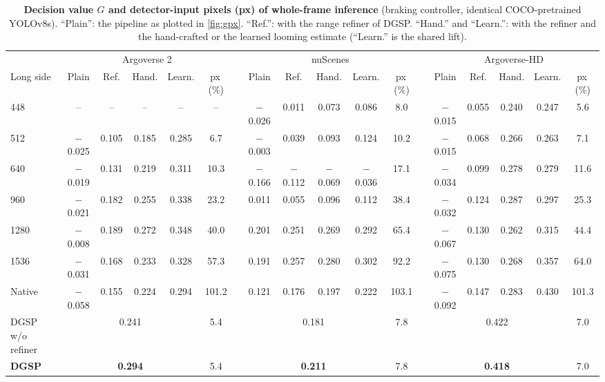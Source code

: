 \documentclass[10pt,letterpaper]{article}
\newcommand{\method}{DGSP\xspace}
\newcommand{\G}{G}
\newcommand{\oursrow}{\rowcolor{oursbg}}
\newcommand{\na}{--}
\theoremstyle{remark}
\theoremstyle{plain}
\theoremstyle{definition}
\begin{document}
\begin{landscape}
\begin{table}[!h]
\centering
\caption{\textbf{Decision value $\G$ and detector-input pixels (px) of whole-frame inference} (braking controller, identical COCO-pretrained YOLOv8s). ``Plain'': the pipeline as plotted in \cref{fig:gpx}. ``Ref.'': with the range refiner of \method. ``Hand.'' and ``Learn.'': with the refiner and the hand-crafted or the learned looming estimate (``Learn.'' is the shared lift).}
\label{tab:uniform}
\small
\setlength{\tabcolsep}{2.6pt}
\begin{tabular}{@{}lccccccccccccccccc@{}}
\toprule
 & \multicolumn{5}{c}{Argoverse 2} & & \multicolumn{5}{c}{nuScenes} & & \multicolumn{5}{c}{Argoverse-HD} \\
\cmidrule(lr){2-6}\cmidrule(lr){8-12}\cmidrule(l){14-18}
Long side & Plain & Ref. & Hand. & Learn. & px\,(\%) & & Plain & Ref. & Hand. & Learn. & px\,(\%) & & Plain & Ref. & Hand. & Learn. & px\,(\%) \\
\midrule
448 & \na & \na & \na & \na & \na &  & $-$0.026 & 0.011 & 0.073 & 0.086 & 8.0 &  & $-$0.015 & 0.055 & 0.240 & 0.247 & 5.6 \\
512 & $-$0.025 & 0.105 & 0.185 & 0.285 & 6.7 &  & $-$0.003 & 0.039 & 0.093 & 0.124 & 10.2 &  & $-$0.015 & 0.068 & 0.266 & 0.263 & 7.1 \\
640 & $-$0.019 & 0.131 & 0.219 & 0.311 & 10.3 &  & $-$0.166 & $-$0.112 & $-$0.069 & $-$0.036 & 17.1 &  & $-$0.034 & 0.099 & 0.278 & 0.279 & 11.6 \\
960 & $-$0.021 & 0.182 & 0.255 & 0.338 & 23.2 &  & 0.011 & 0.055 & 0.096 & 0.112 & 38.4 &  & $-$0.032 & 0.124 & 0.287 & 0.297 & 25.3 \\
1280 & $-$0.008 & 0.189 & 0.272 & 0.348 & 40.0 &  & 0.201 & 0.251 & 0.269 & 0.292 & 65.4 &  & $-$0.067 & 0.130 & 0.262 & 0.315 & 44.4 \\
1536 & $-$0.031 & 0.168 & 0.233 & 0.328 & 57.3 &  & 0.191 & 0.257 & 0.280 & 0.302 & 92.2 &  & $-$0.075 & 0.130 & 0.268 & 0.357 & 64.0 \\
Native & $-$0.058 & 0.155 & 0.224 & 0.294 & 101.2 &  & 0.121 & 0.176 & 0.197 & 0.222 & 103.1 &  & $-$0.092 & 0.147 & 0.283 & 0.430 & 101.3 \\
\midrule
\method w/o refiner & \multicolumn{4}{c}{0.241} & 5.4 &  & \multicolumn{4}{c}{0.181} & 7.8 &  & \multicolumn{4}{c}{0.422} & 7.0 \\
\oursrow \textbf{\method} & \multicolumn{4}{c}{\textbf{0.294}} & 5.4 &  & \multicolumn{4}{c}{\textbf{0.211}} & 7.8 &  & \multicolumn{4}{c}{\textbf{0.418}} & 7.0 \\
\bottomrule
\end{tabular}
\end{table}
\end{landscape}
\end{document}
